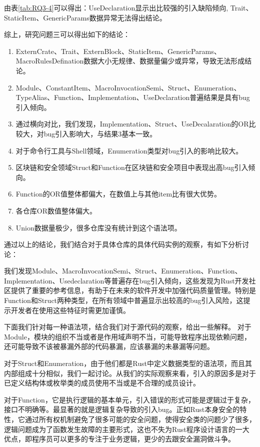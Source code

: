 由表\ref{tab:RQ3-4}可以得出：UseDeclaration显示出比较强的引入缺陷倾向, Trait、StaticItem、GenericParams数据异常无法得出结论。

综上，研究问题三可以得出如下的结论：

\begin{enumerate}
    \item ExternCrate、Trait、ExternBlock、StaticItem、GenericParams、MacroRulesDefination数据大小无规律、数据量偏少或异常，导致无法形成结论。
    \item Module、ConstantItem、MacroInvocationSemi、Struct、Enumeration、TypeAlias、Function、Implementation、UseDeclaration普遍结果是具有bug引入倾向。
    \item 通过横向对比，我们发现，Implementation、Struct、UseDecalaration的OR比较大，对bug引入影响大，与结果3基本一致。
    \item 对于命令行工具与Shell领域，Enumeration类型对bug引入的影响比较大。
    \item 区块链和安全领域Struct和Function在区块链和安全项目中表现出高bug引入倾向。
    \item Function的OR值整体都偏大，在数值上与其他item比有很大优势。
    \item 各仓库OR数值整体偏大。
    \item Union数据量极少，很多仓库没有统计到这个语法项。
\end{enumerate}

通过以上的结论，我们结合对于具体仓库的具体代码实例的观察，有如下分析讨论：

我们发现Module、MacroInvocationSemi、Struct、Enumeration、Function、Implementation、Usedeclaration等普遍存在bug引入倾向，这些发现为Rust开发社区提供了重要的参考信息，有助于在未来的软件开发中加强代码质量管理。特别是Function和Struct两种类型，在所有领域中普遍显示出较高的bug引入风险，这提示开发者在使用这些特征时需更加谨慎。

下面我们针对每一种语法项，结合我们对于源代码的观察，给出一些解释。
对于Module，模块的组织不当或者是作用域声明不当，可能导致程序出现依赖问题，还可能导致不该被暴漏外部的代码暴漏，应该暴漏的未暴漏等问题。

对于Struct和Enumeration，由于他们都是Rust中定义数据类型的语法项，而且其内部组成十分相似，我们一起讨论。从我们的实际观察来看，引入的原因多是对于已定义结构体或枚举类的成员使用不当或是不合理的成员设计。

对于Function，它是执行逻辑的基本单元，引入错误的形式可能是逻辑过于复杂，接口不明确等。最显著的就是逻辑复杂导致的引入bug。正如Rust本身安全的特性，它通过所有权机制避免了很多可能的安全问题，使得安全类的问题少了很多，逻辑问题成为了函数发生故障的主要形式，这也不失为Rust程序设计语言的一大优点，即程序员可以更多的专注于业务逻辑，更少的去跟安全漏洞做斗争。


